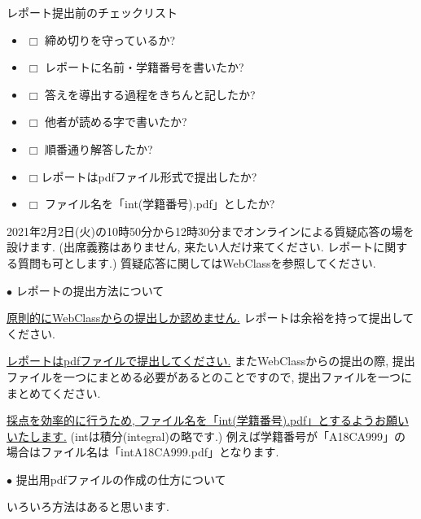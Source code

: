 \documentclass[dvipdfmx,a4paper,11pt]{article}
\theoremstyle{definition}
\begin{document}
 \begin{tcolorbox}[
    colback = white,
    colframe = black,
    fonttitle = \bfseries,
    breakable = true]
    レポート提出前のチェックリスト
    \begin{itemize}
    \item[] $\Box$ 締め切りを守っているか?
    \item[] $\Box$ レポートに名前・学籍番号を書いたか?
     \item[] $\Box$ 答えを導出する過程をきちんと記したか?
    \item[] $\Box$ 他者が読める字で書いたか?
    \item[] $\Box$ 順番通り解答したか?
    \item[] $\Box$レポートはpdfファイル形式で提出したか?
   \item[] $\Box$ ファイル名を「int(学籍番号).pdf」としたか?
    \end{itemize}

  \end{tcolorbox}
  
2021年2月2日(火)の10時50分から12時30分までオンラインによる質疑応答の場を設けます. (出席義務はありません, 来たい人だけ来てください. レポートに関する質問も可とします.) 質疑応答に関してはWebClassを参照してください.
 
\newpage
 \hspace{-11pt}
{\Large $\bullet$ レポートの提出方法について }
\vspace{11pt}

\underline{原則的にWebClassからの提出しか認めません.}
レポートは余裕を持って提出してください.
\vspace{11pt}

\underline{レポートはpdfファイルで提出してください.}
またWebClassからの提出の際, 提出ファイルを一つにまとめる必要があるとのことですので, 提出ファイルを一つにまとめてください.
\vspace{11pt}

\underline{採点を効率的に行うため, ファイル名を「int(学籍番号).pdf」とするようお願いいたします.}
(intは積分(integral)の略です.)
例えば学籍番号が「A18CA999」の場合はファイル名は「intA18CA999.pdf」となります.

\vspace{11pt}
 \hspace{-11pt}
{\Large $\bullet$ 提出用pdfファイルの作成の仕方について}
\vspace{11pt}

いろいろ方法はあると思います.
\vspace{11pt}
\end{document}

